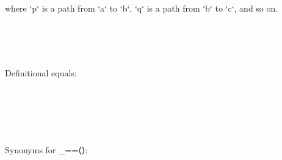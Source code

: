 {{{where `p` is a path from `a` to `b`, `q` is a path from `b` to `c`, and so on.

\begin{code}%
\>[0]\<%
\\
\>[0][@{}l@{\AgdaIndent{0}}]%
\>[2]\<%
\\
%
\>[2]\AgdaSymbol{\{}\AgdaSpace{}%
\AgdaSymbol{:}\AgdaSpace{}%
\AgdaSpace{}%
\AgdaSymbol{\}}\<%
\\
%
\>[2]\<%
\end{code}

Definitional equals:

\begin{code}%
%
\>[2]\<%
\\
\>[2][@{}l@{\AgdaIndent{0}}]%
\>[4]\AgdaSymbol{:}\AgdaSpace{}%
\AgdaSpace{}%
\AgdaSymbol{(}\AgdaSpace{}%
\AgdaSymbol{\{}\AgdaSymbol{\}}\AgdaSpace{}%
\AgdaSymbol{:}\AgdaSpace{}%
\AgdaSymbol{)}\<%
\\
%
\>[2]\AgdaSpace{}%
\AgdaSpace{}%
\AgdaSpace{}%
\AgdaSpace{}%
\AgdaOperator{\AgdaDatatype{==}}\AgdaSpace{}%
\AgdaSpace{}%
\AgdaSpace{}%
\AgdaSpace{}%
\AgdaOperator{\AgdaDatatype{==}}\AgdaSpace{}%
\<%
\\
%
\\[\AgdaEmptyExtraSkip]%
%
\>[2]\AgdaSymbol{\AgdaUnderscore{}}\AgdaSpace{}%
\AgdaSpace{}%
\AgdaSpace{}%
\AgdaSymbol{=}\AgdaSpace{}%
\<%
\end{code}

Synonyms for _==⟨⟩:

\begin{code}%
%
\>[2]%
\>[13]\AgdaSymbol{=}\AgdaSpace{}%
\<%
\\
%
\>[2]\AgdaSpace{}%
\AgdaSymbol{=}\AgdaSpace{}%
\<%
\\
%
\>[2]%
\>[13]\AgdaSymbol{=}\AgdaSpace{}%
\<%
\\
%
\\[\AgdaEmptyExtraSkip]%
%
\>[2]\AgdaSpace{}%
\AgdaSpace{}%
\AgdaSpace{}%
\AgdaSpace{}%
\AgdaSpace{}%
\<%
\end{code}

}}}
